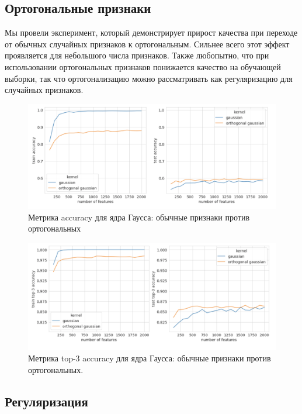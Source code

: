 \documentclass{article}
\begin{document}
\subsection{Ортогональные признаки}

Мы провели эксперимент, который демонстрирует прирост качества при переходе от обычных случайных признаков к ортогональным. Сильнее всего этот эффект проявляется для небольшого числа признаков. Также любопытно, что при использовании ортогональных признаков понижается качество на обучающей выборки, так что ортогонализацию можно рассматривать как регуляризацию для случайных признаков.

\begin{figure}[H]
    \centering
    \includegraphics[width=14cm]{images/orthogonal_top1.png}
    \caption{Метрика accuracy для ядра Гаусса: обычные признаки против ортогональных}
    \label{fig:my_label}
\end{figure}{}

\begin{figure}[H]
    \centering
    \includegraphics[width=14cm]{images/orthogonal_top3.png}
    \caption{Метрика top-3 accuracy для ядра Гаусса: обычные признаки против ортогональных.}
    \label{fig:my_label}
\end{figure}{}

\subsection{Регуляризация}
\end{document}
